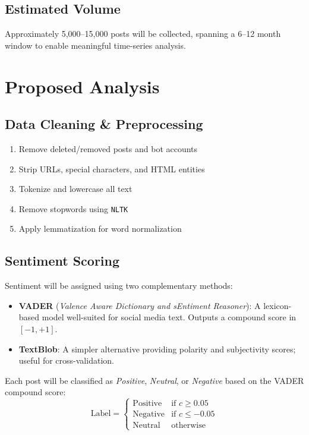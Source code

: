 \documentclass[12pt, letterpaper]{article}
\begin{document}
\subsection{Estimated Volume}

Approximately 5,000--15,000 posts will be collected, spanning a 6--12 month window to enable meaningful time-series analysis.

\section{Proposed Analysis}

\subsection{Data Cleaning \& Preprocessing}

\begin{enumerate}[noitemsep]
    \item Remove deleted/removed posts and bot accounts
    \item Strip URLs, special characters, and HTML entities
    \item Tokenize and lowercase all text
    \item Remove stopwords using \texttt{NLTK}
    \item Apply lemmatization for word normalization
\end{enumerate}

\subsection{Sentiment Scoring}

Sentiment will be assigned using two complementary methods:

\begin{itemize}
    \item \textbf{VADER} (\textit{Valence Aware Dictionary and sEntiment Reasoner}): A lexicon-based model well-suited for social media text. Outputs a compound score in $[-1, +1]$.
    \item \textbf{TextBlob}: A simpler alternative providing polarity and subjectivity scores; useful for cross-validation.
\end{itemize}

Each post will be classified as \textit{Positive}, \textit{Neutral}, or \textit{Negative} based on the VADER compound score:
\[
\text{Label} =
\begin{cases}
\text{Positive} & \text{if } c \geq 0.05 \\
\text{Negative} & \text{if } c \leq -0.05 \\
\text{Neutral} & \text{otherwise}
\end{cases}
\]
\end{document}
